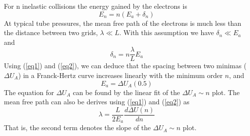 \documentclass[%
 reprint,
 amsmath,amssymb,
 aps,
]{revtex4-2}
\begin{document}
    \par
    For n inelastic collisions the energy gained by the electrons is \cite{2006AmJPh..74..423R}
    \begin{equation}
    \label{eq1}
        E_n = n(E_a + \delta_n)
    \end{equation}
    At typical tube pressures, the mean free path of the electrons is much less than the distance between two grids, $\lambda \ll L$. With this assumption we have $\delta_n \ll E_a$ and
    \begin{equation}
    \label{eq2}
        \delta_n = n \frac{\lambda}{L} E_a
    \end{equation}
    Using (\ref{eq1}) and (\ref{eq2}), we can deduce that the spacing between two minimas ($\Delta U_A$) in a Franck-Hertz curve increases linearly with the minimum order $n$, and
    \begin{equation}
    \label{eq3}
        \boxed{E_a = \Delta U_A(0.5)}
    \end{equation}
    The equation for $\Delta U_A$ can be found by the linear fit of the $\Delta U_A \sim n$ plot.
    The mean free path can also be derives using (\ref{eq1}) and (\ref{eq2}) as
    \begin{equation}
    \label{eq4}
        \boxed{\lambda = \frac{L}{2 E_a} \frac{d \Delta U(n)}{dn}}
    \end{equation}
    That is, the second term denotes the slope of the $\Delta U_A \sim n$ plot.
    
\end{document}
